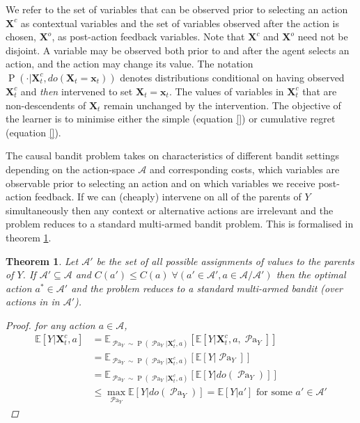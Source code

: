 \documentclass[11pt,a4paper,oneside]{book}
\newcommand{\actionspace}{\mathcal{A}}
\newcommand{\Esub}[2]{\mathbb E_{#1}\left[{#2}\right]}
\newcommand{\E}[1]{\mathbb E\left[{#1}\right]}
\newcommand{\eq}[1]{\begin{align*}#1\end{align*}}
\renewcommand{\P}[1]{\operatorname{P}\left(#1\right)}
\newcommand{\parents}[1]{\operatorname{\mathcal{P}a}_{#1}}
\renewcommand{\vec}[1]{\boldsymbol{#1}}
\theoremstyle{plain}
\newtheorem{theorem}{Theorem}
\theoremstyle{definition}
\begin{document}
We refer to the set of variables that can be observed prior to selecting an action $\vec{X}^c$ as contextual variables and the set of variables observed after the action is chosen, $\vec{X}^o$, as post-action feedback variables. Note that $\vec{X}^c$ and $\vec{X}^o$ need not be disjoint. A variable may be observed both prior to and after the agent selects an action, and the action may change its value. The notation $\P{\cdot|\vec{X}^c_t, do(\vec{X}_t = \vec{x}_t)}$ denotes distributions conditional on having observed $\vec{X}^c_t$ and \emph{then} intervened to set $\vec{X}_t = \vec{x}_t$. The values of variables in $\vec{X}^c_t$ that are non-descendents of $\vec{X}_t$ remain unchanged by the intervention. The objective of the learner is to minimise either the simple (equation \ref{}) or cumulative regret (equation \ref{}). 

The causal bandit problem takes on characteristics of different bandit settings depending on the action-space $\actionspace$ and corresponding costs, which variables are observable prior to selecting an action and on which variables we receive post-action feedback. If we can (cheaply) intervene on all of the parents of $Y$ simultaneously then any context or alternative actions are irrelevant and the problem reduces to a standard multi-armed bandit problem. This is formalised in theorem \ref{theorem:cb-intervene-all-parents}. 

\vspace{0.5cm}
\begin{theorem}
\label{theorem:cb-intervene-all-parents}
Let $\mathcal{A'}$ be the set of all possible assignments of values to the parents of $Y$. If $\mathcal{A'} \subseteq \mathcal{A}$ and $C(a') \leq C(a) \; \forall (a' \in \mathcal{A'}, a \in \mathcal{A}/\mathcal{A'})$ then the optimal action $a^* \in \mathcal{A'}$ and the problem reduces to a standard multi-armed bandit (over actions in in $\mathcal{A'}$).
\begin{proof}
for any action $a \in \mathcal{A}$, 
\eq{
 \E{Y|\vec{X}^c_t,a} &= \Esub{\parents{Y}\sim \P{\parents{Y}|\vec{X}^c_t,a}}{\E{Y|\vec{X}^c_t,a,\parents{Y}}} \\
 &= \Esub{\parents{Y}\sim \P{\parents{Y}|\vec{X}^c_t,a}}{\E{Y|\parents{Y}}}\\
 &= \Esub{\parents{Y}\sim \P{\parents{Y}|\vec{X}^c_t,a}}{\E{Y|do(\parents{Y})}}\\
 &\leq \max_{\parents{Y}}\E{Y|do(\parents{Y})} = \E{Y|a'} \text{ for some $a' \in \mathcal{A'}$}
}
\end{proof}
\end{theorem} 
\end{document}
